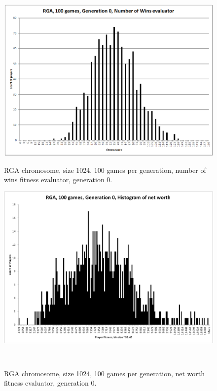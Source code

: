 \begin{figure}
\centering
\begin{minipage}[t]{0.47\linewidth}
\centering
\includegraphics[width=1.0\linewidth]{Figures/RGA_1024_G000_N100_NW.png}
\caption[RGA Num Wins Fitness Distribution, Initial Generation]{RGA chromosome,
size 1024, 100 games per generation, number of wins fitness evaluator,
generation 0.}
\label{figure-RGA-G000-N100-NW-initial_fitness}
\end{minipage}%
\hspace{0.06\linewidth}%
\begin{minipage}[t]{0.47\linewidth}
\centering
\includegraphics[width=1.0\linewidth]{Figures/RGA_1024_G000_N100_NetW.png}
\caption[Historgram of RGA Net Worth Fitness Distribution, Initial
Generation]{RGA chromosome, size 1024, 100 games per generation, net worth
fitness evaluator, generation 0.}
\label{figure-RGA-G000-N100-NetW-initial_fitness}
\end{minipage}
\\[\intextsep]


\end{figure}
